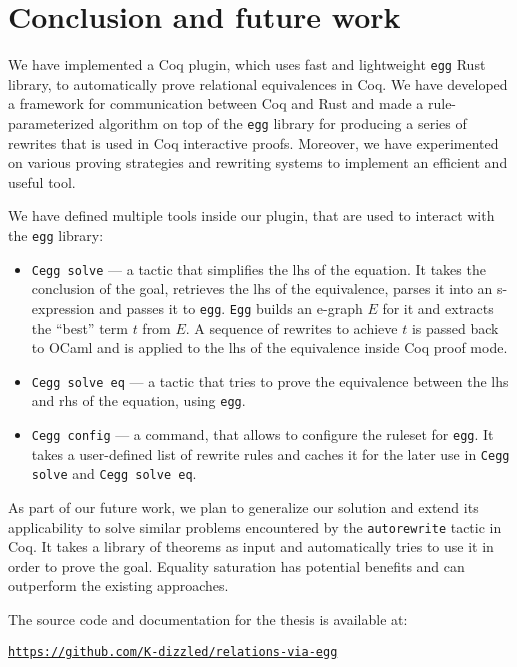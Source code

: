 \section{Conclusion and future work}

We have implemented a Coq plugin, which uses fast and lightweight \texttt{egg} Rust library, to automatically prove relational equivalences in Coq. We have developed a framework for communication between Coq and Rust and made a rule-parameterized algorithm on top of the \texttt{egg} library for producing a series of rewrites that is used in Coq interactive proofs. Moreover, we have experimented on various proving strategies and rewriting systems to implement an efficient and useful tool. 

We have defined multiple tools inside our plugin, that are used to interact with the \texttt{egg} library: 
\begin{itemize}
    \item \texttt{Cegg solve} --- a tactic that simplifies the lhs of the equation. It takes the conclusion of the goal, retrieves the lhs of the equivalence, parses it into an s-expression and passes it to \texttt{egg}. \texttt{Egg} builds an e-graph $E$ for it and extracts the ``best'' term $t$ from $E$. A sequence of rewrites to achieve $t$ is passed back to OCaml and is applied to the lhs of the equivalence inside Coq proof mode. 
    \item \texttt{Cegg solve eq} --- a tactic that tries to prove the equivalence between the lhs and rhs of the equation, using \texttt{egg}. 
    \item \texttt{Cegg config} --- a command, that allows to configure the ruleset for \texttt{egg}. It takes a user-defined list of rewrite rules and caches it for the later use in \texttt{Cegg solve} and \texttt{Cegg solve eq}.
\end{itemize}

As part of our future work, we plan to generalize our solution and extend its applicability to solve similar problems encountered by the \texttt{autorewrite} tactic in Coq. It takes a library of theorems as input and automatically tries to use it in order to prove the goal. Equality saturation has potential benefits and can outperform the existing approaches.  

The source code and documentation for the thesis is available at:
\begin{center}
    \href{https://github.com/K-dizzled/relations-via-egg}{\texttt{https://github.com/K-dizzled/relations-via-egg}}
\end{center}